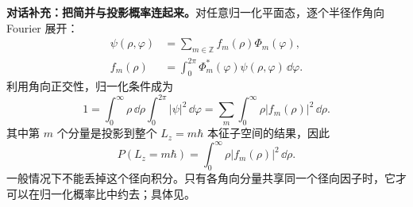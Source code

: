 \textbf{对话补充：把简并与投影概率连起来。}对任意归一化平面态，逐个半径作角向 Fourier 展开：
\begin{align}
  \psi(\rho,\varphi)&=\sum_{m\in\mathbb Z} f_m(\rho)\Phi_m(\varphi),\\
  f_m(\rho)&=\int_0^{2\pi}\Phi_m^*(\varphi)\psi(\rho,\varphi)\,\dd\varphi.
\end{align}
利用角向正交性，归一化条件成为
\begin{equation}
  1=\int_0^\infty\rho\,\dd\rho\int_0^{2\pi}|\psi|^2\,\dd\varphi
   =\sum_m\int_0^\infty\rho|f_m(\rho)|^2\,\dd\rho.
\end{equation}
其中第 $m$ 个分量是投影到整个 $L_z=m\hbar$ 本征子空间的结果，因此
\begin{equation}
  \boxed{P(L_z=m\hbar)=\int_0^\infty\rho|f_m(\rho)|^2\,\dd\rho}.
  \label{eq:QM-C12-S03-probability}
\end{equation}
一般情况下不能丢掉这个径向积分。只有各角向分量共享同一个径向因子时，它才可以在归一化概率比中约去；具体见。



